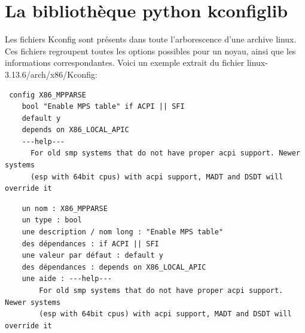 \documentclass[17pts]{report}
\begin{document}
\section{La bibliothèque python kconfiglib}
\label{sec:La bibliothèque python kconfiglib}

Les fichiers Kconfig sont présents dans toute l'arborescence d'une archive
linux.  Ces fichiers regroupent toutes les options possibles pour un noyau,
ainsi que les informations correspondantes.  Voici un exemple extrait du
fichier linux-3.13.6/arch/x86/Kconfig:
\begin{verbatim}
 config X86_MPPARSE
    bool "Enable MPS table" if ACPI || SFI
    default y
    depends on X86_LOCAL_APIC
    ---help---
      For old smp systems that do not have proper acpi support. Newer systems
      (esp with 64bit cpus) with acpi support, MADT and DSDT will override it
\end{verbatim}
\begin{verbatim}
    un nom : X86_MPPARSE
    un type : bool
    une description / nom long : "Enable MPS table"
    des dépendances : if ACPI || SFI
    une valeur par défaut : default y
    des dépendances : depends on X86_LOCAL_APIC
    une aide : ---help---
        For old smp systems that do not have proper acpi support. Newer systems
        (esp with 64bit cpus) with acpi support, MADT and DSDT will override it
\end{verbatim}
\end{document}
